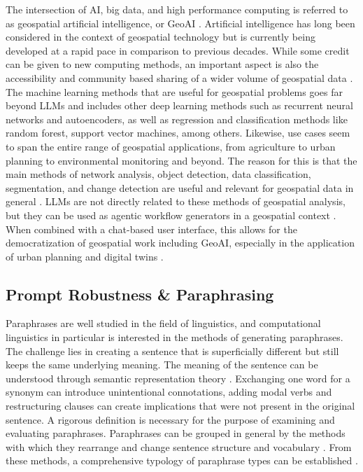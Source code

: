 The intersection of AI, big data, and high performance computing is referred to as geospatial
artificial intelligence, or GeoAI \citep{li2020}. Artificial intelligence has long been
considered in the context of geospatial technology but is currently being developed at a rapid
pace in comparison to previous decades. While some credit can be given to new computing methods,
an important aspect is also the accessibility and community based sharing of a wider volume of
geospatial data \citep{janowicz2020}. The machine learning methods that are useful for
geospatial problems goes far beyond LLMs and includes other deep learning methods such as
recurrent neural networks and autoencoders, as well as regression and classification methods
like random forest, support vector machines, among others. Likewise, use cases seem to span the
entire range of geospatial applications, from agriculture to urban planning to environmental
monitoring and beyond. The reason for this is that the main methods of network analysis, object
detection, data classification, segmentation, and change detection are useful and relevant for
geospatial data in general \citep{boutayeb2025}. LLMs are not directly related to these methods
of geospatial analysis, but they can be used as agentic workflow generators in a geospatial
context \citep{bhattaram2025}. When combined with a chat-based user interface, this allows for
the democratization of geospatial work including GeoAI, especially in the application of urban
planning and digital twins \citep{ye2026}.

\subsection{Prompt Robustness \& Paraphrasing}
\label{sec:paraphrasing}

Paraphrases are well studied in the field of linguistics, and computational linguistics in
particular is interested in the methods of generating paraphrases. The challenge lies in creating
a sentence that is superficially different but still keeps the same underlying meaning. The
meaning of the sentence can be understood through semantic representation theory
\citep{abend2017}. Exchanging one word for a synonym can introduce unintentional connotations,
adding modal verbs and restructuring clauses can create implications that were not present in
the original sentence. A rigorous definition is necessary for the purpose of examining and
evaluating paraphrases. Paraphrases can be grouped in general by the methods with which they
rearrange and change sentence structure and vocabulary \citep{bhagat2013}. From these methods, a
comprehensive typology of paraphrase types can be established \citep{vila2014}.

